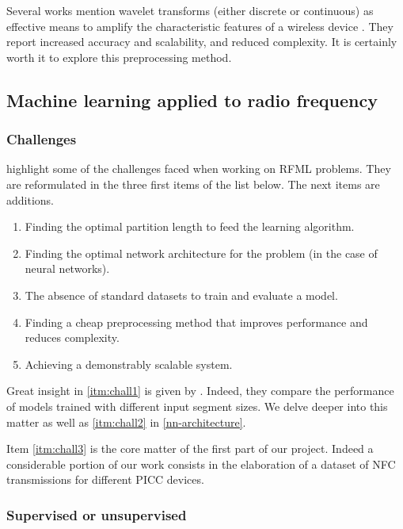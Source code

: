 Several works mention wavelet transforms (either discrete or continuous) as effective means to amplify the characteristic features of a wireless device \cite{xu_device_2015, oyedare_estimating_2019, youssef_machine_2017}. They report increased accuracy and scalability, and reduced complexity. It is certainly worth it to explore this preprocessing method.

\subsection{Machine learning applied to radio frequency}

\subsubsection{Challenges}

\textcite{riyaz_deep_2018} highlight some of the challenges faced when working on RFML problems. They are reformulated in the three first items of the list below. The next items are additions.

\begin{enumerate}
  \item \label{itm:chall1} Finding the optimal partition length to feed the learning algorithm.
  \item \label{itm:chall2} Finding the optimal network architecture for the problem (in the case of neural networks).
  \item \label{itm:chall3} The absence of standard datasets to train and evaluate a model.
  \item Finding a cheap preprocessing method that improves performance and reduces complexity.
  \item Achieving a demonstrably scalable system.
\end{enumerate}

Great insight in \autoref{itm:chall1} is given by \textcite{youssef_machine_2017}. Indeed, they compare the performance of models trained with different input segment sizes. We delve deeper into this matter as well as \autoref{itm:chall2} in \autoref{nn-architecture}.

Item \ref{itm:chall3} is the core matter of the first part of our project. Indeed a considerable portion of our work consists in the elaboration of a dataset of NFC transmissions for different PICC devices.

\subsubsection{Supervised or unsupervised}

